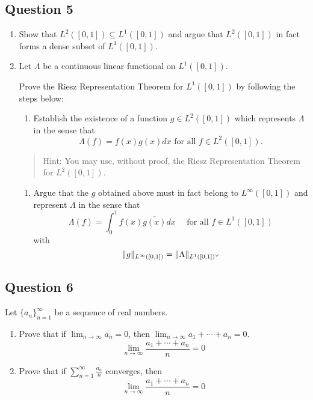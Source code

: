 \documentclass[12pt]{article}
\providecommand{\tightlist}{%
  \setlength{\itemsep}{0pt}\setlength{\parskip}{0pt}}
\begin{document}
\hypertarget{question-5-1}{%
\subsection{Question 5}\label{question-5-1}}

\begin{enumerate}
\def\labelenumi{\alph{enumi}.}
\item
  Show that \(L^2([0, 1]) \subseteq L^1([0, 1])\) and argue that
  \(L^2([0, 1])\) in fact forms a dense subset of \(L^1([0, 1])\).
\item
  Let \(\Lambda\) be a continuous linear functional on \(L^1([0, 1])\).

  Prove the Riesz Representation Theorem for \(L^1([0, 1])\) by
  following the steps below:

  \begin{enumerate}
  \def\labelenumii{\roman{enumii}.}
  \tightlist
  \item
    Establish the existence of a function \(g \in L^2([0, 1])\) which
    represents \(\Lambda\) in the sense that \[
    \Lambda(f ) = f (x)g(x) dx \text{ for all } f \in L^2([0, 1]).
    \]
  \end{enumerate}

  \begin{quote}
  Hint: You may use, without proof, the Riesz Representation Theorem for
  \(L^2([0, 1])\).
  \end{quote}

  \begin{enumerate}
  \def\labelenumii{\roman{enumii}.}
  \setcounter{enumii}{1}
  \tightlist
  \item
    Argue that the \(g\) obtained above must in fact belong to
    \(L^\infty([0, 1])\) and represent \(\Lambda\) in the sense that \[
    \Lambda(f)=\int_{0}^{1} f(x) \overline{g(x)} d x \quad \text { for all } f \in L^{1}([0,1])
    \] with \[
    \|g\|_{L^{\infty}([0,1])}=\|\Lambda\|_{L^{1}([0,1])^\vee}
    \]
  \end{enumerate}
\end{enumerate}

\hypertarget{question-6-1}{%
\subsection{Question 6}\label{question-6-1}}

Let \(\{a_n\}_{n=1}^\infty\) be a sequence of real numbers.

\begin{enumerate}
\def\labelenumi{\alph{enumi}.}
\item
  Prove that if \(\displaystyle\lim_{n\to\infty} a_n = 0\), then
  \(\displaystyle\lim_{n\to\infty} a_1 + \cdots + a_n = 0\). \[
  \lim _{n \rightarrow \infty} \frac{a_{1}+\cdots+a_{n}}{n}=0
  \]
\item
  Prove that if \(\displaystyle\sum_{n=1}^{\infty} \frac{a_{n}}{n}\)
  converges, then \[
  \lim _{n \rightarrow \infty} \frac{a_{1}+\cdots+a_{n}}{n}=0
  \]
\end{enumerate}
\end{document}
